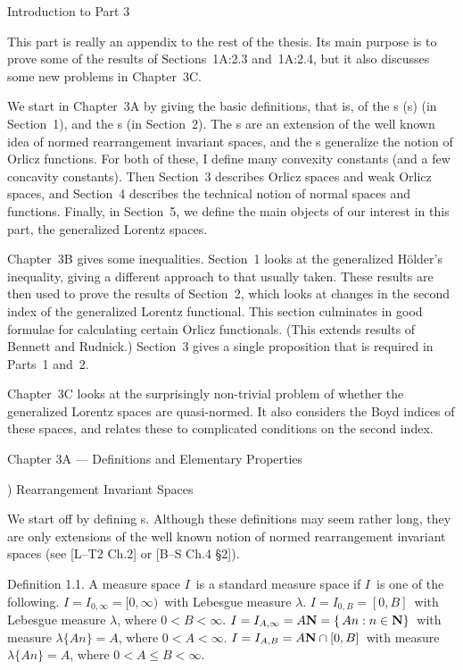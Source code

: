 \beginsection Introduction to Part 3
 
This part is really an appendix to the rest of the thesis. Its main
purpose is
to prove some of the results of Sections~1A:2.3 and~1A:2.4, but it
also
discusses some new problems in Chapter~3C.
 
We start in Chapter~3A by giving the basic definitions, that is,
of the
\fullris s (\ris s) (in Section~1), and the \af s (in Section~2).
The \ris s
are an extension of the well known idea of normed rearrangement invariant
spaces, and the \af s generalize the notion of Orlicz functions.
For both of
these, I define many convexity constants (and a few concavity constants).
Then
Section~3 describes Orlicz spaces and weak Orlicz spaces, and Section~4
describes the technical notion of normal spaces and functions. Finally,
in
Section~5, we define the main objects of our interest in this part,
the
generalized Lorentz spaces.
 
Chapter~3B gives some inequalities. Section~1 looks at the generalized
H\"older's inequality,
giving a different approach to that usually taken. These results
are then used
to prove the results of Section~2, which looks at changes in the
second index
of the generalized Lorentz functional. This section culminates in
good formulae
for calculating certain Orlicz functionals. (This extends results
of
Bennett and Rudnick.) Section~3 gives a single proposition that is
required in Parts~1
and~2.
 
Chapter~3C looks at the surprisingly non-trivial problem of whether
the
generalized Lorentz spaces are quasi-normed. It also considers the
Boyd indices
of these spaces, and relates these to complicated conditions on the
second
index.
 
\vfill
\eject
 
\beginsection Chapter 3A --- Definitions and Elementary Properties
 
) Rearrangement Invariant Spaces
 
We start off by defining \fullris s. Although these definitions may
seem rather
long, they are only extensions of the well known notion of normed
rearrangement
invariant spaces (see
[L--T2 Ch.2] or [B--S Ch.4 \S2]).
 
\proclaim Definition 1.1. A measure space $I$\ is a {\dt standard
measure space} if
$I$\ is one of the following.
\itemi $I = I_{0,\infty} = [0,\infty)$\ with Lebesgue measure $\lambda$.
\itemii $I = I_{0,B} = [0,B]$\ with Lebesgue measure $\lambda$, where
$0<B<\infty$.
\itemiii $I = I_{A,\infty} = A{\bf N} = \{\,An:n\in{\bf N}\}$\ with measure
$\lambda\{An\}=A$, where $0<A<\infty$.
\itemiv $I = I_{A,B} = A{\bf N}\cap[0,B]$\ with measure $\lambda\{An\}=A$,
where
$0<A\le B<\infty$.
 

